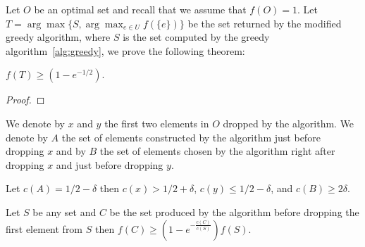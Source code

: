 Let $O$ be an optimal set and recall that we assume that $f(O) = 1$.
Let $T = \arg\max\{S, \displaystyle{\arg\max_{e \in U}}f(\{e\})\}$ 
be the set returned by the modified greedy algorithm, 
where $S$ is the set computed by the greedy algorithm~\ref{alg:greedy},
we prove the following theorem:

\begin{theorem}
$f(T) \geq (1 - e^{-1/2})$.
\end{theorem}

\begin{proof}
\end{proof}


We denote by $x$ and $y$ the first two elements in $O$ dropped by the algorithm.  
We denote by $A$ the set of elements constructed by the algorithm just before
dropping $x$ and by $B$ the set of elements chosen by the algorithm right after dropping $x$ 
and just before dropping $y$.

\begin{figure}[h]
\end{figure}

Let $c(A) = 1/2 - \delta$ 
then $c(x) > 1/2 + \delta$, $c(y) \leq 1/2 - \delta$, and $c(B) \geq 2\delta$.

\begin{lemma}
Let $S$ be any set and $C$ be the set produced by the algorithm 
before dropping the first element from $S$ then $f(C) \geq (1 - e^{-\frac{c(C)}{c(S)}})f(S)$.  
\end{lemma} 

